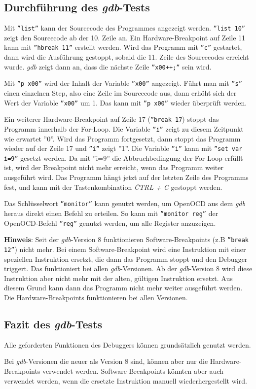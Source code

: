 \subsection{Durchführung des \textit{gdb}-Tests}
Mit \texttt{''list''} kann der Sourcecode des Programmes angezeigt werden.
\texttt{''list 10''} zeigt den Sourcecode ab der 10. Zeile an.
Ein Hardware-Breakpoint auf Zeile 11 kann mit \texttt{''hbreak 11''} erstellt werden.
Wird das Programm mit \texttt{''c''} gestartet, dann wird die Ausführung gestoppt, sobald die 11. Zeile des Sourcecodes erreicht wurde.
\textit{gdb} zeigt dann an, dass die nächste Zeile \texttt{''x00++;''} sein wird.

Mit \texttt{''p x00''} wird der Inhalt der Variable \texttt{''x00''} angezeigt.
Führt man mit \texttt{''s''} einen einzelnen Step, also eine Zeile im Sourcecode aus, dann erhöht sich der Wert der Variable \texttt{''x00''} um 1.
Das kann mit \texttt{''p x00''}  wieder überprüft werden.


Ein weiterer Hardware-Breakpoint auf Zeile 17 (\texttt{''break 17}) stoppt das Programm innerhalb der For-Loop.
Die Variable \texttt{''i''} zeigt zu diesem Zeitpunkt wie erwartet ''0''.
Wird das Programm fortgesetzt, dann stoppt das Programm wieder auf der Zeile 17 und \texttt{''i''} zeigt ''1''.
Die Variable \texttt{''i''} kann mit \texttt{''set var i=9''} gesetzt werden.
Da mit ''i=9'' die Abbruchbedingung der For-Loop erfüllt ist, wird der Breakpoint nicht mehr erreicht, wenn das Programm weiter ausgeführt wird.
Das Programm hängt jetzt auf der letzten Zeile des Programms fest, und kann mit der Tastenkombination \textit{ĈTRL + C} gestoppt werden.

Das Schlüsselwort \texttt{''monitor''} kann genutzt werden, um OpenOCD aus dem \textit{gdb} heraus direkt einen Befehl zu erteilen.
So kann mit \texttt{''monitor reg''} der OpenOCD-Befehl \texttt{''reg''} genutzt werden, um alle Register anzuzeigen.

\textbf{Hinweis}: 
Seit der \textit{gdb}-Version 8 funktionieren Software-Breakpoints (z.B \texttt{''break 12''}) nicht mehr.
Bei einem Software-Breakpoint wird eine Instruktion mit einer speziellen Instruktion ersetzt, die dann das Programm stoppt und den Debugger triggert.
Das funktioniert bei allen \textit{gdb}-Versionen.
Ab der \textit{gdb}-Version 8 wird diese Instruktion aber nicht mehr mit der alten, gültigen Instruktion ersetzt.
Aus diesem Grund kann dann das Programm nicht mehr weiter ausgeführt werden.
Die Hardware-Breakpoints funktionieren bei allen Versionen.


\subsection{Fazit des \textit{gdb}-Tests}
Alle geforderten Funktionen des Debuggers können grundsätzlich genutzt werden.

Bei \textit{gdb}-Versionen die neuer als Version 8 sind, können aber nur die Hardware-Breakpoints verwendet werden.
Software-Breakpoints könnten aber auch verwendet werden, wenn die ersetzte Instruktion manuell wiederhergestellt wird.



